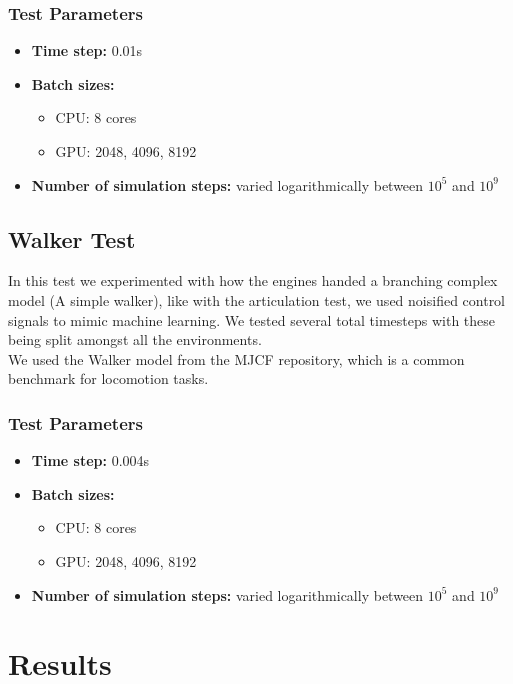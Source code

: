 \documentclass[11pt,a4paper]{article}
\begin{document}
\subsubsection{Test Parameters}
\begin{itemize}
    \item \textbf{Time step:} 0.01s
    \item \textbf{Batch sizes:} 
    \begin{itemize}
        \item CPU: 8 cores 
        \item GPU: 2048, 4096, 8192
    \end{itemize}
    \item \textbf{Number of simulation steps:} varied logarithmically between $10^5$ and $10^9$
\end{itemize}

\subsection{Walker Test}
In this test we experimented with how the engines handed a branching complex model (A simple walker), like with the articulation test, we used noisified control signals to mimic machine learning. We tested several total timesteps with these being split amongst all the environments. \\
We used the Walker model from the MJCF repository, which is a common benchmark for locomotion tasks.

\subsubsection{Test Parameters}
\begin{itemize}
    \item \textbf{Time step:} 0.004s
    \item \textbf{Batch sizes:} 
    \begin{itemize}
        \item CPU: 8 cores 
        \item GPU: 2048, 4096, 8192
    \end{itemize}
    \item \textbf{Number of simulation steps:} varied logarithmically between $10^5$ and $10^9$
\end{itemize}

\section{Results}
\end{document}
